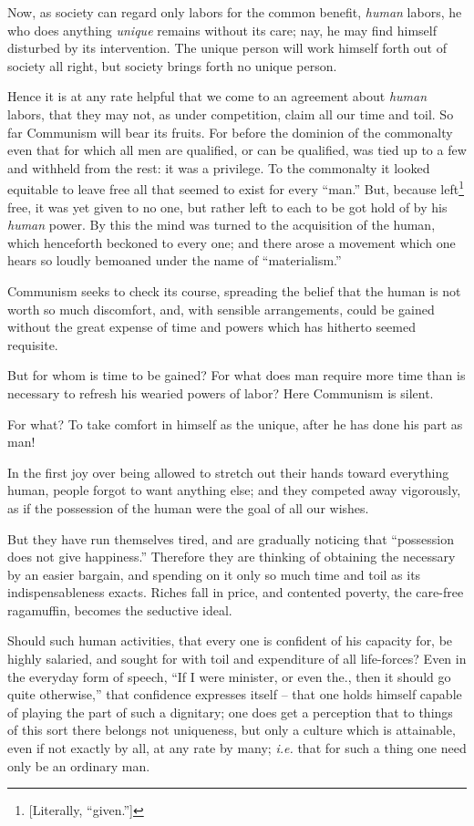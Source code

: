 Now, as society can regard only labors for the common benefit, \textit{human} 
labors, he who does anything \textit{unique} remains without its care; nay, he 
may find himself disturbed by its intervention. The unique person will work 
himself forth out of society all right, but society brings forth no unique 
person.

Hence it is at any rate helpful that we come to an agreement about 
\textit{human} labors, that they may not, as under competition, claim all our 
time and toil. So far Communism will bear its fruits. For before the dominion 
of the commonalty even that for which all men are qualified, or can be 
qualified, was tied up to a few and withheld from the rest: it was a 
privilege. To the commonalty it looked equitable to leave free all that seemed 
to exist for every ``man.'' But, because left\footnote{[Literally, 
``given.'']} free, it was yet given to no one, but rather left to each to be 
got hold of by his \textit{human} power. By this the mind was turned to the 
acquisition of the human, which henceforth beckoned to every one; and there 
arose a movement which one hears so loudly bemoaned under the name of 
``materialism.''

Communism seeks to check its course, spreading the belief that the human is 
not worth so much discomfort, and, with sensible arrangements, could be gained 
without the great expense of time and powers which has hitherto seemed 
requisite.

But for whom is time to be gained? For what does man require more time than is 
necessary to refresh his wearied powers of labor? Here Communism is silent.

For what? To take comfort in himself as the unique, after he has done his part 
as man!

In the first joy over being allowed to stretch out their hands toward 
everything human, people forgot to want anything else; and they competed away 
vigorously, as if the possession of the human were the goal of all our wishes.

But they have run themselves tired, and are gradually noticing that 
``possession does not give happiness.'' Therefore they are thinking of 
obtaining the necessary by an easier bargain, and spending on it only so much 
time and toil as its indispensableness exacts. Riches fall in price, and 
contented poverty, the care-free ragamuffin, becomes the seductive ideal.

Should such human activities, that every one is confident of his capacity for, 
be highly salaried, and sought for with toil and expenditure of all 
life-forces? Even in the everyday form of speech, ``If I were minister, or 
even the., then it should go quite otherwise,'' that confidence expresses 
itself -- that one holds himself capable of playing the part of such a 
dignitary; one does get a perception that to things of this sort there belongs 
not uniqueness, but only a culture which is attainable, even if not exactly by 
all, at any rate by many; \textit{i.e.} that for such a thing one need only be 
an ordinary man.

